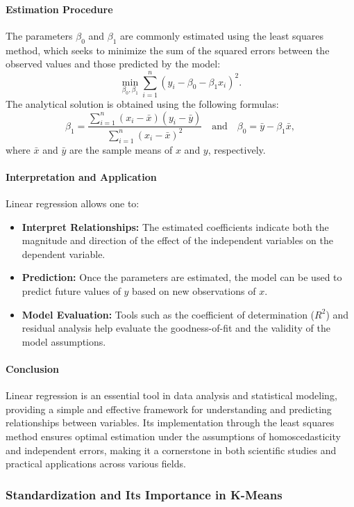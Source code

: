 \documentclass[10pt]{article}
\begin{document}
\paragraph{Estimation Procedure}  
The parameters \( \beta_0 \) and \( \beta_1 \) are commonly estimated using the least squares method, which seeks to minimize the sum of the squared errors between the observed values and those predicted by the model:
\[
\min_{\beta_0, \beta_1} \sum_{i=1}^{n} \left(y_i - \beta_0 - \beta_1 x_i\right)^2.
\]
The analytical solution is obtained using the following formulas:
\[
\beta_1 = \frac{\sum_{i=1}^{n} (x_i - \bar{x})(y_i - \bar{y})}{\sum_{i=1}^{n} (x_i - \bar{x})^2} \quad \text{and} \quad \beta_0 = \bar{y} - \beta_1 \bar{x},
\]
where \(\bar{x}\) and \(\bar{y}\) are the sample means of \( x \) and \( y \), respectively.

\paragraph{Interpretation and Application}  
Linear regression allows one to:
\begin{itemize}
    \item \textbf{Interpret Relationships:} The estimated coefficients indicate both the magnitude and direction of the effect of the independent variables on the dependent variable.
    \item \textbf{Prediction:} Once the parameters are estimated, the model can be used to predict future values of \( y \) based on new observations of \( x \).
    \item \textbf{Model Evaluation:} Tools such as the coefficient of determination (\(R^2\)) and residual analysis help evaluate the goodness-of-fit and the validity of the model assumptions.
\end{itemize}

\paragraph{Conclusion}  
Linear regression is an essential tool in data analysis and statistical modeling, providing a simple and effective framework for understanding and predicting relationships between variables. Its implementation through the least squares method ensures optimal estimation under the assumptions of homoscedasticity and independent errors, making it a cornerstone in both scientific studies and practical applications across various fields.

\subsubsection{Standardization and Its Importance in K-Means}
\end{document}
